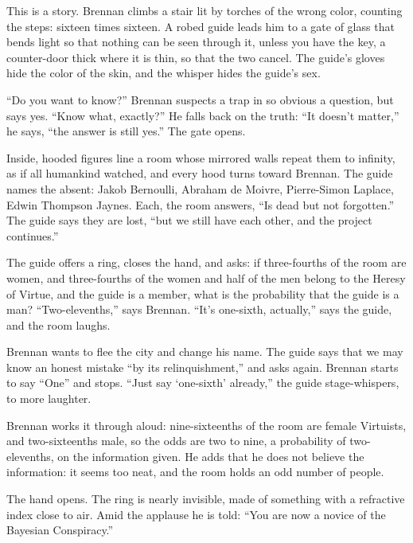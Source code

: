 
This is a story. Brennan climbs a stair lit by torches of the wrong color, counting the steps: sixteen times sixteen. A robed guide leads him to a gate of glass that bends light so that nothing can be seen through it, unless you have the key, a counter-door thick where it is thin, so that the two cancel. The guide's gloves hide the color of the skin, and the whisper hides the guide's sex. 

``Do you want to know?'' Brennan suspects a trap in so obvious a question, but says yes. ``Know what, exactly?'' He falls back on the truth: ``It doesn't matter,'' he says, ``the answer is still yes.'' The gate opens.

Inside, hooded figures line a room whose mirrored walls repeat them to infinity, as if all humankind watched, and every hood turns toward Brennan. The guide names the absent: Jakob Bernoulli, Abraham de Moivre, Pierre-Simon Laplace, Edwin Thompson Jaynes. Each, the room answers, ``Is dead but not forgotten.'' The guide says they are lost, ``but we still have each other, and the project continues.'' 

The guide offers a ring, closes the hand, and asks: if three-fourths of the room are women, and three-fourths of the women and half of the men belong to the Heresy of Virtue, and the guide is a member, what is the probability that the guide is a man? ``Two-elevenths,'' says Brennan. ``It's one-sixth, actually,'' says the guide, and the room laughs. 

Brennan wants to flee the city and change his name. The guide says that we may know an honest mistake ``by its relinquishment,'' and asks again. Brennan starts to say ``One'' and stops. ``Just say `one-sixth' already,'' the guide stage-whispers, to more laughter. 

Brennan works it through aloud: nine-sixteenths of the room are female Virtuists, and two-sixteenths male, so the odds are two to nine, a probability of two-elevenths, on the information given. He adds that he does not believe the information: it seems too neat, and the room holds an odd number of people. 

The hand opens. The ring is nearly invisible, made of something with a refractive index close to air. Amid the applause he is told: ``You are now a novice of the Bayesian Conspiracy.'' 

